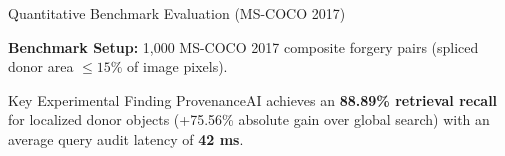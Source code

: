 \documentclass[aspectratio=169,xcolor=table,10pt]{beamer}
\begin{document}
\begin{frame}{Quantitative Benchmark Evaluation (MS-COCO 2017)}
  \vspace{-0.2cm}
  \begin{center}
    \footnotesize \textbf{Benchmark Setup:} 1,000 MS-COCO 2017 composite forgery pairs (spliced donor area $\le 15\%$ of image pixels).
  \end{center}

  \vspace{-0.15cm}
  \renewcommand{\arraystretch}{1.1}
  \begin{table}[h]
    \centering
    \small
  \end{table}

  \vspace{-0.1cm}
  \begin{block}{Key Experimental Finding}
    \footnotesize ProvenanceAI achieves an \textbf{88.89\% retrieval recall} for localized donor objects (+75.56\% absolute gain over global search) with an average query audit latency of \textbf{42 ms}.
  \end{block}
\end{frame}
\end{document}
